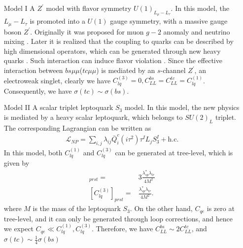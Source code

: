 \documentclass[a4paper,11pt]{article}
\begin{document}
\begin{enumerate}
    \item[Model I]   A $Z^{\prime}$ model with flavor symmetry $U(1)_{L_{\mu}-L_{\tau}}$.
        In this model, the $L_{\mu}-L_{\tau}$ is promoted into a $U(1)$ gauge symmetry,
      with a massive gauge boson $Z^{\prime}$.
    Originally it was proposed for muon $g-2$ anomaly \cite{Baek:2001kca} and neutrino mixing \cite{Ma:2001md}.
    Later it is realized that the coupling to quarks can be described by high dimensional operators, which can be generated through new heavy quarks \cite{Fox:2011qd}.
    Such interaction can induce flavor violation \cite{Altmannshofer:2014cfa}.
    Since the effective interaction between $bs\mu\mu$($tc\mu\mu$) is mediated by an $s$-channel $Z^{\prime}$, an electroweak singlet,
    clearly we have $C_{lq}^{(3)}=0,C_{LL}^{bs}=C_{LL}^{tc}=C_{lq}^{(1)}$.
    Consequently, we have $\sigma(tc)\sim\sigma(bs)$.

    \item[Model II] A scalar triplet leptoquark $S_3$ model.
        In this model, the new physics is mediated by a heavy scalar leptoquark, which belongs to $SU(2)_L$ triplet.
        The corresponding Lagrangian can be written as \cite{Dorsner:2016wpm}
        \begin{align}
            \mathcal{L}_{NP}=\sum_{i,j}\lambda_{ij}\bar{Q}_i^c(i\tau^2)\tau^{I}L_jS_3^{I}+\textrm{h.c.}
        \end{align}
        In this model, both $C_{lq}^{(1)}$ and $C_{lq}^{(3)}$ can be generated at tree-level, which is given by \cite{Gherardi:2020det}
        \begin{align}
            [C_{lq}^{(1)}]_{prst}=&3\frac{\lambda_{sp}^{*}\lambda_{tr}}{4M^2}\\
            [C_{lq}^{(3)}]_{prst}=&\frac{\lambda_{sp}^{*}\lambda_{tr}}{4M^2}.
        \end{align}
        where $M$ is the mass of the leptoquark $S_3$.
        On the other hand, $C_{qe}$ is zero at tree-level, and it can only be generated through loop corrections, and hence we expect $C_{qe}\ll C_{lq}^{(1)},C_{lq}^{(3)}$.
        Therefore, we have $C_{LL}^{bs}\sim2C_{LL}^{tc}$,
        and $\sigma(tc)\sim\frac{1}{4}\sigma(bs)$


\end{enumerate}
\end{document}
